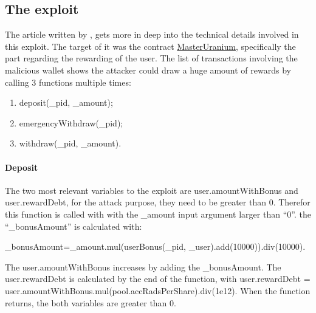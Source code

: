 \subsection{The exploit}
\label{sec:Uranium:Exploit}


The article written by \citeauthor{UraniumTech}, gets more in deep into the technical details involved in this exploit.
The target of it was the contract \href{https://bscscan.com/address/0xd5aac41d315c1d382dcf1c39d4ed9b37c224edf2#code}{MasterUranium}, specifically the part regarding the rewarding of the user.
The list of transactions involving the malicious wallet shows the attacker could draw a huge amount of rewards 
by calling 3 functions multiple times:
\begin{enumerate}
    \item deposit(\_pid, \_amount); 
    \item emergencyWithdraw(\_pid); 
    \item withdraw(\_pid, \_amount).
\end{enumerate}


\paragraph{Deposit} The two most relevant variables to the exploit are user.amountWithBonus and user.rewardDebt, for the attack purpose, they need to be greater than 0.
Therefor this function is called with  with the \_amount input argument larger than “0”. 
the “\_bonusAmount” is calculated with:

\_bonusAmount=\_amount.mul(userBonus(\_pid, \_user).add(10000)).div(10000).

The user.amountWithBonus increases by adding  the \_bonusAmount. 
The user.rewardDebt is calculated by the end of the function, with
user.rewardDebt = user.amountWithBonus.mul(pool.accRadsPerShare).div(1e12).
When the function returns, the  both variables are greater than 0.

